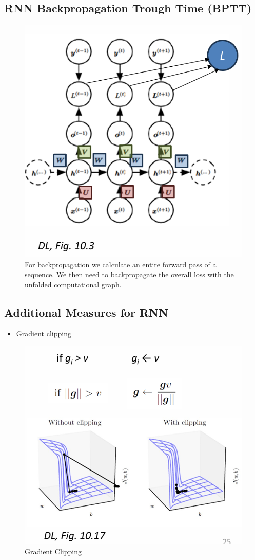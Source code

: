 \documentclass[../Main.tex]{subfiles}
\begin{document}
\subsection{RNN Backpropagation Trough Time (BPTT)}
\begin{figure}[H]
    \centering
    \includegraphics[width=0.5\linewidth]{Images/deepl/rnn-back.png}
    \caption{For backpropagation we calculate an entire forward pass of a sequence.
    We then need to backpropagate the overall loss with the unfolded computational graph.}
\end{figure}


\subsection{Additional Measures for RNN}
\begin{itemize}
    \item Gradient clipping
\end{itemize}

\begin{figure}[H]
    \centering
    \includegraphics[width=0.5\linewidth]{Images/deepl/gradient-clipping.png}
    \caption{Gradient Clipping}
\end{figure}
\end{document}
